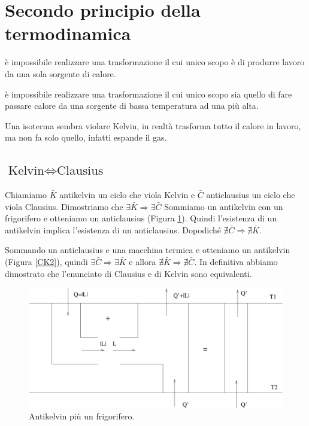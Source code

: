 \section{Secondo principio della termodinamica}

\begin{Pri}
è impossibile realizzare una trasformazione il cui unico scopo è di produrre lavoro da una sola sorgente di calore.
\end{Pri}

\begin{Pri}
è impossibile realizzare una trasformazione il cui unico scopo sia quello di fare passare calore da una sorgente di bassa temperatura ad una più alta.
\end{Pri}

Una isoterma sembra violare Kelvin, in realtà trasforma tutto il calore in lavoro, ma non fa solo quello, infatti espande il gas.
\subsection{\texorpdfstring{$\text{Kelvin}\Leftrightarrow\text{Clausius}$}{Kelvin <=> Clausius}}

Chiamiamo $\bar{K}$ antikelvin un ciclo che viola Kelvin e $\bar{C}$ anticlausius un ciclo che viola Clausius. Dimostriamo che $\exists\bar{K}\Rightarrow\exists\bar{C}$ Sommiamo un antikelvin con un frigorifero e otteniamo un anticlausius (Figura \ref{CK1}). Quindi l'esistenza di un antikelvin implica l'esistenza di un anticlausius. Dopodiché $\nexists\bar{C}\Rightarrow\nexists\bar{K}$.

Sommando un anticlausius e una macchina termica e otteniamo un antikelvin (Figura \ref{CK2}), quindi
 $\exists\bar{C}\Rightarrow\exists\bar{K}$ e allora $\nexists\bar{K}\Rightarrow\nexists\bar{C}$. In definitiva abbiamo dimostrato che l'enunciato di Clausius e di Kelvin sono equivalenti.
\begin{figure}[htbp]
\centering
\includegraphics[scale=0.5]{immagini/fisica1/AK+Frigo}
\caption{Antikelvin più un frigorifero.}
\label{CK1}
\end{figure}

